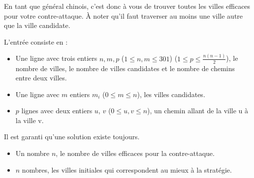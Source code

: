 En tant que général chinois, c'est donc à vous de trouver toutes les villes efficaces pour votre contre-attaque. À noter qu'il faut traverser au moins une ville autre que la ville candidate.

\begin{Input}
    L'entrée consiste en :
    \begin{itemize}
        \item Une ligne avec trois entiers $n, m, p$ ($1 \leq n, m\leq 301$) ($1 \leq p \leq \frac{n (n-1)}{2}$), le nombre de villes, le nombre de villes candidates et le nombre de chemins entre deux villes.
        \item Une ligne avec $m$ entiers $m_i$ ($0 \leq m \leq n$), les villes candidates.
        \item $p$ lignes avec deux entiers $u$, $v$ ($0 \leq u, v \leq n$), un chemin allant de la ville u à la ville v.
    \end{itemize}
    Il est garanti qu'une solution existe toujours.
\end{Input}

\begin{Output}
    \begin{itemize}
        \item Un nombre $n$, le nombre de villes efficaces pour la contre-attaque.
        \item $n$ nombres, les villes initiales qui correspondent au mieux à la stratégie.
    \end{itemize}
\end{Output}
